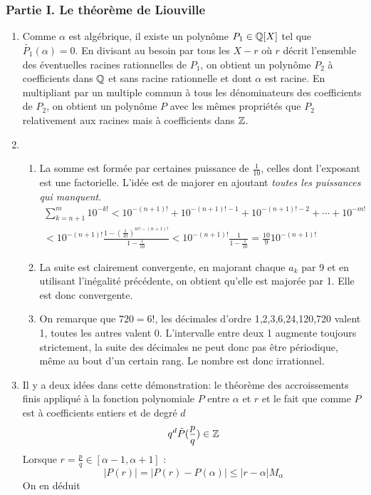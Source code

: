 \subsubsection*{Partie I. Le théorème de Liouville}
\begin{enumerate}
\item Comme $\alpha$ est algébrique, il existe un polynôme $P_1\in \mathbb{Q} [X]$ tel que $\tilde{P_1}(\alpha)=0$. En divisant au besoin par tous les $X-r$ où $r$ décrit l'ensemble des éventuelles racines rationnelles de $P_1$, on obtient un polynôme $P_2$ à coefficients dans $\mathbb{Q}$ et sans racine rationnelle et dont $\alpha$ est racine. En multipliant par un multiple commun à tous les dénominateurs des coefficients de $P_2$, on obtient un polynôme $P$ avec les mêmes propriétés que $P_2$ relativement aux racines mais à coefficients dans $\mathbb{Z}$.
\item \begin{enumerate}
\item La somme est formée par certaines puissance de $\frac{1}{10}$, celles dont l'exposant est une factorielle. L'idée est de majorer en ajoutant \emph{toutes les puissances qui manquent}.
\begin{multline*}
\sum_{k=n+1}^{m}10^{-k!} < 10^{-(n+1)!} +10^{-(n+1)!-1}+10^{-(n+1)!-2}+\cdots +10^{-m!} \\
 <  10^{-(n+1)!}\frac{1-(\frac{1}{10})^{m!-(n+1)!}}{1-\frac{1}{10}}
< 10^{-(n+1)!}\frac{1}{1-\frac{1}{10}}=\frac{10}{9}10^{-(n+1)!}
\end{multline*}
\item La suite est clairement convergente, en majorant chaque $a_k$ par 9 et en utilisant l'inégalité précédente, on obtient qu'elle est majorée par 1. Elle est donc convergente.
\item On remarque que $720=6!$, les décimales d'ordre 1,2,3,6,24,120,720 valent 1, toutes les autres valent 0. L'intervalle entre deux 1 augmente toujours strictement, la suite des décimales ne peut donc pas être périodique, même au bout d'un certain rang. Le nombre est donc irrationnel.
\end{enumerate}
\item Il y a deux idées dans cette démonstration: le théorème des accroissements finis appliqué à la fonction polynomiale $P$ entre $\alpha$ et $r$ et le fait que comme $P$ est à coefficients entiers et de degré $d$
\[q^d\tilde{P}(\frac{p}{q})\in \mathbb{Z}\]
Lorsque $r=\frac{p}{q}\in[\alpha -1,\alpha +1]$ :
\[\vert P(r)\vert = \vert P(r) -P(\alpha)\vert \leq \vert r-\alpha\vert M_\alpha\]
On en déduit

\end{enumerate}

